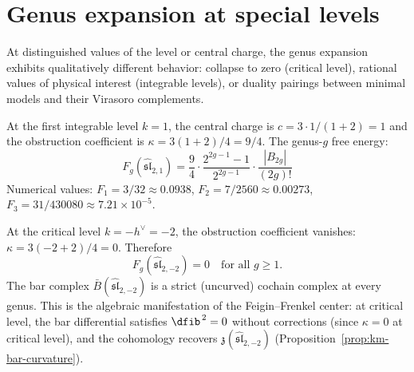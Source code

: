 
\section{Genus expansion at special levels}
\label{sec:special-level-genera}

At distinguished values of the level or central charge, the
genus expansion exhibits qualitatively different behavior:
collapse to zero (critical level), rational values of
physical interest (integrable levels), or duality pairings
between minimal models and their Virasoro complements.

\begin{computation}[\texorpdfstring{$\widehat{\mathfrak{sl}}_2$}{sl-hat_2} at level \texorpdfstring{$k = 1$}{k = 1}]

\label{comp:sl2-k1-genera}
At the first integrable level $k = 1$, the central charge is
$c = 3 \cdot 1/(1+2) = 1$ and the obstruction coefficient
is $\kappa = 3(1+2)/4 = 9/4$. The genus-$g$ free energy:
\[
F_g(\widehat{\mathfrak{sl}}_{2,1}) = \frac{9}{4}
\cdot \frac{2^{2g-1}-1}{2^{2g-1}} \cdot
\frac{|B_{2g}|}{(2g)!}
\]
Numerical values:
$F_1 = 3/32 \approx 0.0938$,
$F_2 = 7/2560 \approx 0.00273$,
$F_3 = 31/430080 \approx 7.21 \times 10^{-5}$.
\end{computation}

\begin{computation}[\texorpdfstring{$\widehat{\mathfrak{sl}}_2$}{sl-hat_2} at critical
level \texorpdfstring{$k = -2$}{k = -2}]

\label{comp:sl2-critical-genera}
At the critical level $k = -h^\vee = -2$, the obstruction
coefficient vanishes: $\kappa = 3(-2+2)/4 = 0$. Therefore
\begin{equation}\label{eq:sl2-critical-vanishing}
F_g(\widehat{\mathfrak{sl}}_{2,-2}) = 0
\quad \text{for all } g \geq 1.
\end{equation}
The bar complex $\bar{B}(\widehat{\mathfrak{sl}}_{2,-2})$
is a strict (uncurved) cochain complex at every genus.
This is the algebraic manifestation of the Feigin--Frenkel
center: at critical level, the bar differential satisfies
$\dfib^{\,2} = 0$ without corrections (since $\kappa = 0$ at critical level), and the cohomology recovers
$\mathfrak{z}(\widehat{\mathfrak{sl}}_{2,-2})$
(Proposition~\ref{prop:km-bar-curvature}).
\end{computation}

